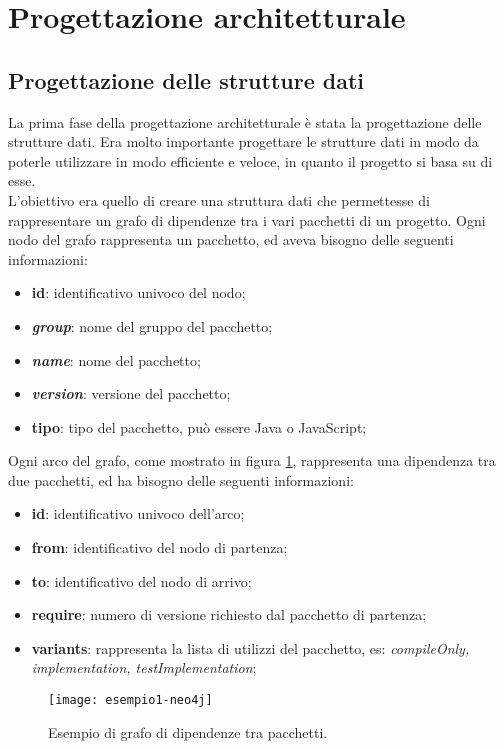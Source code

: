 
\section{Progettazione architetturale}
\subsection*{Progettazione delle strutture dati}
La prima fase della progettazione architetturale è stata la progettazione delle strutture dati. 
Era molto importante progettare le strutture dati in modo da poterle utilizzare in modo efficiente e 
veloce, in quanto il progetto si basa su di esse.\\
L'obiettivo era quello di creare una struttura dati che permettesse di rappresentare un grafo di dipendenze tra i vari pacchetti di un progetto.
Ogni nodo del grafo rappresenta un pacchetto, ed aveva bisogno delle seguenti informazioni:
\begin{itemize}
  \item \textbf{id}: identificativo univoco del nodo;
  \item \textbf{\textit{group}}: nome del gruppo del pacchetto;
  \item \textbf{\textit{name}}: nome del pacchetto;
  \item \textbf{\textit{version}}: versione del pacchetto;
  \item \textbf{tipo}: tipo del pacchetto, può essere Java o JavaScript;
\end{itemize}

\noindent Ogni arco del grafo, come mostrato in figura \ref*{fig:esempio1-neo4j}, rappresenta una dipendenza tra due pacchetti, 
ed ha bisogno delle seguenti informazioni:
\begin{itemize}
  \item \textbf{id}: identificativo univoco dell'arco;
  \item \textbf{from}: identificativo del nodo di partenza;
  \item \textbf{to}: identificativo del nodo di arrivo;
  \item \textbf{require}: numero di versione richiesto dal pacchetto di partenza;
  \item \textbf{variants}: rappresenta la lista di utilizzi del pacchetto, es: \textit{compileOnly, implementation, testImplementation}; 
\end{itemize}

\begin{figure}[!h] 
  \centering 
  \texttt{[image: esempio1-neo4j]} 
  \caption{Esempio di grafo di dipendenze tra pacchetti.}
  \label{fig:esempio1-neo4j}
\end{figure}

